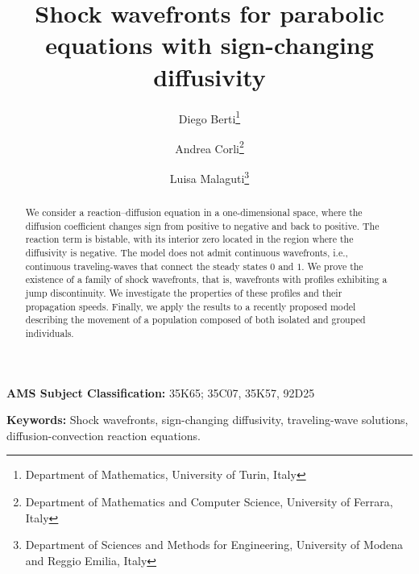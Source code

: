 \documentclass[11pt,a4paper]{article}
\begin{document}
\date{}
\title{
Shock wavefronts for parabolic equations with sign-changing diffusivity
\\
}
\author{
Diego Berti\footnote{Department of Mathematics, University of Turin, Italy}
\and
Andrea Corli\footnote{Department of Mathematics and Computer Science, University of Ferrara, Italy}
\and
Luisa Malaguti\footnote{Department of Sciences and Methods for Engineering, University of Modena and Reggio Emilia, Italy}
}

\maketitle
\begin{abstract}
We consider a reaction–diffusion equation in a one-dimensional space, where the diffusion coefficient changes sign from positive to negative and back to positive. The reaction term is bistable, with its interior zero located in the region where the diffusivity is negative. The model does not admit continuous wavefronts, i.e., continuous traveling-waves that connect the steady states $0$ and $1$. We prove the existence of a family of shock wavefronts, that is, wavefronts with profiles exhibiting a jump discontinuity. We investigate the properties of these profiles and their propagation speeds. Finally, we apply the results to a recently proposed model describing the movement of a population composed of both isolated and grouped individuals.
\end{abstract}

\vspace{1cm}
\noindent \textbf{AMS Subject Classification:} 35K65; 35C07, 35K57, 92D25

\smallskip
\noindent
\textbf{Keywords:} Shock wavefronts, sign-changing diffusivity, traveling-wave solutions, diffusion-convection reaction equations.
\end{document}
